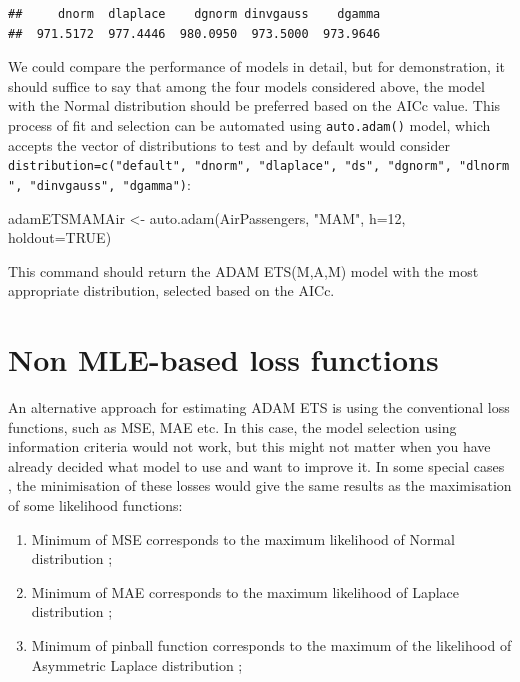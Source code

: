 \documentclass[
]{book}
\newenvironment{Shaded}{\begin{snugshade}}{\end{snugshade}}
\newcommand{\AttributeTok}[1]{\textcolor[rgb]{0.77,0.63,0.00}{#1}}
\newcommand{\ConstantTok}[1]{\textcolor[rgb]{0.00,0.00,0.00}{#1}}
\newcommand{\DecValTok}[1]{\textcolor[rgb]{0.00,0.00,0.81}{#1}}
\newcommand{\FunctionTok}[1]{\textcolor[rgb]{0.00,0.00,0.00}{#1}}
\newcommand{\NormalTok}[1]{#1}
\newcommand{\OtherTok}[1]{\textcolor[rgb]{0.56,0.35,0.01}{#1}}
\newcommand{\StringTok}[1]{\textcolor[rgb]{0.31,0.60,0.02}{#1}}
\providecommand{\tightlist}{%
  \setlength{\itemsep}{0pt}\setlength{\parskip}{0pt}}
\theoremstyle{definition}
\theoremstyle{definition}
\theoremstyle{definition}
\theoremstyle{definition}
\theoremstyle{remark}
\begin{document}
\begin{verbatim}
##     dnorm  dlaplace    dgnorm dinvgauss    dgamma 
##  971.5172  977.4446  980.0950  973.5000  973.9646
\end{verbatim}

We could compare the performance of models in detail, but for demonstration, it should suffice to say that among the four models considered above, the model with the Normal distribution should be preferred based on the AICc value. This process of fit and selection can be automated using \texttt{auto.adam()} model, which accepts the vector of distributions to test and by default would consider \texttt{distribution=c("default",\ "dnorm",\ "dlaplace",\ "ds",\ "dgnorm",\ "dlnorm",\ "dinvgauss",\ "dgamma")}:

\begin{Shaded}
\begin{Highlighting}[]
\NormalTok{adamETSMAMAir }\OtherTok{\textless{}{-}} \FunctionTok{auto.adam}\NormalTok{(AirPassengers, }\StringTok{"MAM"}\NormalTok{, }\AttributeTok{h=}\DecValTok{12}\NormalTok{, }\AttributeTok{holdout=}\ConstantTok{TRUE}\NormalTok{)}
\end{Highlighting}
\end{Shaded}

This command should return the ADAM ETS(M,A,M) model with the most appropriate distribution, selected based on the AICc.

\hypertarget{non-mle-based-loss-functions}{%
\section{Non MLE-based loss functions}\label{non-mle-based-loss-functions}}

An alternative approach for estimating ADAM ETS is using the conventional loss functions, such as MSE, MAE etc. In this case, the model selection using information criteria would not work, but this might not matter when you have already decided what model to use and want to improve it. In some special cases \citep[as discussed in Chapter 3 of][]{SvetunkovSBA}, the minimisation of these losses would give the same results as the maximisation of some likelihood functions:

\begin{enumerate}
\def\labelenumi{\arabic{enumi}.}
\tightlist
\item
  Minimum of MSE corresponds to the maximum likelihood of Normal distribution \citep[see discussion in][]{Kolassa2016};
\item
  Minimum of MAE corresponds to the maximum likelihood of Laplace distribution \citep{Schwertman1990};
\item
  Minimum of pinball function \citep[quantile regression]{Koenker1978} corresponds to the maximum of the likelihood of Asymmetric Laplace distribution \citep{Yu2005};
\end{enumerate}
\end{document}
